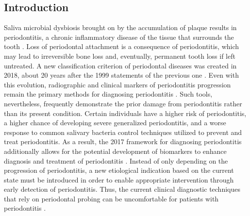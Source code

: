\documentclass[11pt, a4paper, onecolumn, oneside]{report}
\begin{document}
        \subsection{Introduction}
            Saliva microbial dysbiosis brought on by the accumulation of plaque results in periodontitis, a chronic inflammatory disease of the tissue that surrounds the tooth \cite{Periodontitis-2}. Loss of periodontal attachment is a consequence of periodontitis, which may lead to irreversible bone loss and, eventually, permanent tooth loss if left untreated. A new classification criterion of periodontal diseases was created in 2018, about 20 years after the 1999 statements of the previous one \cite{Periodontitis-4}. Even with this evolution, radiographic and clinical markers of periodontitis progression remain the primary methods for diagnosing periodontitis \cite{Periodontitis-4}. Such tools, nevertheless, frequently demonstrate the prior damage from periodontitis rather than its present condition. Certain individuals have a higher risk of periodontitis, a higher chance of developing severe generalized periodontitis, and a worse response to common salivary bacteria control techniques utilized to prevent and treat periodontitis. As a result, the 2017 framework for diagnosing periodontitis additionally allows for the potential development of biomarkers to enhance diagnosis and treatment of periodontitis \cite{Periodontitis-5}. Instead of only depending on the progression of periodontitis, a new etiological indication based on the current state must be introduced in order to enable appropriate intervention through early detection of periodontitis. Thus, the current clinical diagnostic techniques that rely on periodontal probing can be uncomfortable for patients with periodontitis \cite{Periodontitis-6}.
\end{document}
